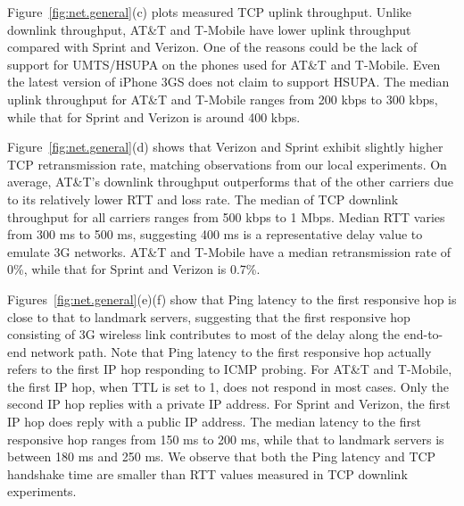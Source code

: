 Figure~\ref{fig:net.general}(c) plots measured TCP uplink throughput.
Unlike downlink throughput, AT\&T and T-Mobile have lower uplink
throughput compared with Sprint and Verizon. One of the reasons 
could be the lack of support for UMTS/HSUPA on the phones used for 
AT\&T and T-Mobile. Even the latest version of iPhone 3GS does not 
claim to support HSUPA. 
The median uplink throughput for AT\&T and T-Mobile ranges from 
200 kbps to 300 kbps, while that for Sprint and Verizon is around 
400 kbps. 

Figure~\ref{fig:net.general}(d) shows that Verizon and Sprint exhibit
slightly higher TCP retransmission rate, matching observations from 
our local experiments. %
On average, AT\&T's downlink throughput outperforms that of the 
other carriers due to its relatively lower RTT and loss rate. The 
median of TCP downlink throughput for all carriers ranges from 500 
kbps to 1 Mbps. Median RTT varies from 300 ms to 500 ms, suggesting 
400 ms is a representative delay value to emulate 3G networks. AT\&T 
and T-Mobile have a median retransmission rate of 0\%, while that 
for Sprint and Verizon is 0.7\%.

Figures~\ref{fig:net.general}(e)(f) show that Ping latency to the 
first responsive hop is close to that to landmark servers, suggesting
that the first responsive hop consisting of 3G wireless link 
contributes to most of the delay along the end-to-end network path. 
Note that Ping latency to the first responsive hop actually refers 
to the first IP hop responding to ICMP probing. For AT\&T and 
T-Mobile, the first IP hop, when TTL is set to 1, does not respond
in most cases.
Only the second IP hop replies with a private IP address. For 
Sprint and Verizon, the first IP hop does reply with a public IP 
address. The median latency to the first responsive hop ranges 
from 150 ms to 200 ms, while that to landmark servers is between 
180 ms and 250 ms. We observe that both the Ping latency and TCP 
handshake time are smaller than RTT values measured in TCP downlink 
experiments. 


